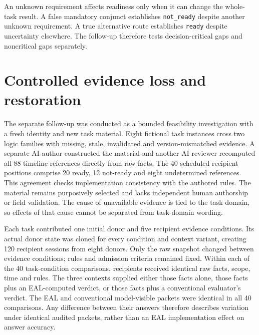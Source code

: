 \documentclass[preprint,11pt]{elsarticle}
\begin{document}
An unknown requirement affects readiness only when it can change the
whole-task result. A false mandatory conjunct establishes
\texttt{not\_ready} despite another unknown requirement. A true
alternative route establishes \texttt{ready} despite uncertainty
elsewhere. The follow-up therefore tests decision-critical gaps and
noncritical gaps separately.

\FloatBarrier

\hypertarget{controlled-evidence-loss-and-restoration}{%
\section{Controlled evidence loss and
restoration}\label{controlled-evidence-loss-and-restoration}}

The separate follow-up was conducted as a bounded feasibility
investigation with a fresh identity and new task material. Eight
fictional task instances cross two logic families with missing, stale,
invalidated and version-mismatched evidence. A separate AI author
constructed the material and another AI reviewer recomputed all 88
timeline references directly from raw facts. The 40 scheduled recipient
positions comprise 20 ready, 12 not-ready and eight undetermined
references. This agreement checks implementation consistency with the
authored rules. The material remains purposively selected and lacks
independent human authorship or field validation. The cause of
unavailable evidence is tied to the task domain, so effects of that
cause cannot be separated from task-domain wording.

Each task contributed one initial donor and five recipient evidence
conditions. Its actual donor state was cloned for every condition and
context variant, creating 120 recipient sessions from eight donors. Only
the raw snapshot changed between evidence conditions; rules and
admission criteria remained fixed. Within each of the 40 task-condition
comparisons, recipients received identical raw facts, scope, time and
rules. The three contexts supplied either those facts alone, those facts
plus an EAL-computed verdict, or those facts plus a conventional
evaluator's verdict. The EAL and conventional model-visible packets were
identical in all 40 comparisons. Any difference between their answers
therefore describes variation under identical audited packets, rather
than an EAL implementation effect on answer accuracy.
\end{document}
